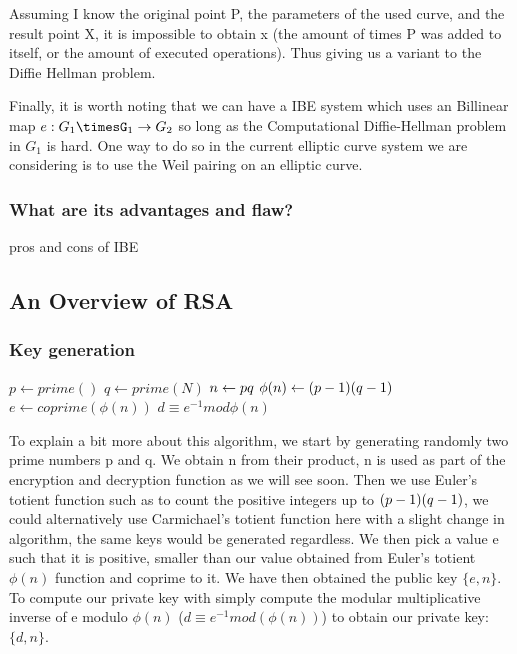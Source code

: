 \documentclass[conference]{IEEEtran}
\begin{document}
Assuming I know the original point P, the parameters of the used curve, and the result point X, it is impossible
to obtain x (the amount of times P was added to itself, or the amount of executed operations).
Thus giving us a variant to the Diffie Hellman problem.

Finally, it is worth noting that we can have a IBE system which uses an Billinear map 
$e: G_{1}\timesG_{1} \rightarrow G_{2}$ so long as the Computational Diffie-Hellman problem 
in $G_{1}$ is hard. One way to do so in the current elliptic curve system we are considering is to use 
the Weil pairing on an elliptic curve.
\subsubsection{What are its advantages and flaw?}
pros and cons of IBE

\subsection{An Overview of RSA}
\subsubsection{Key generation}

\begin{algorithmic}
\STATE $p \leftarrow prime()$
\STATE $q \leftarrow prime(N)$
\STATE $n \leftarrow p \* q$
\STATE $\phi (n) \leftarrow (p - 1) \* (q - 1)$
\STATE $e \leftarrow coprime(\phi (n))$
\STATE $d \equiv e^{-1} mod \phi(n)$
\end{algorithmic}
To explain a bit more about this algorithm, we start by generating randomly two prime numbers
p and q. We obtain n from their product, n is used as part of the encryption and decryption function
as we will see soon. Then we use Euler's totient function such as to count the positive integers
up to $(p - 1) \* (q - 1)$, we could alternatively use Carmichael's totient function here 
with a slight change in algorithm, the same keys would be generated regardless. We then pick a value e
such that it is positive, smaller than our value obtained from Euler's totient $\phi(n) $ function and coprime to it.
We have then obtained the public key $\{e,n\}$. To compute our private key with simply compute 
the modular multiplicative inverse of e modulo $\phi(n)$ ($d \equiv e^{-1} mod(\phi(n))$) to obtain
our private key: $\{d,n\}$.
\end{document}
